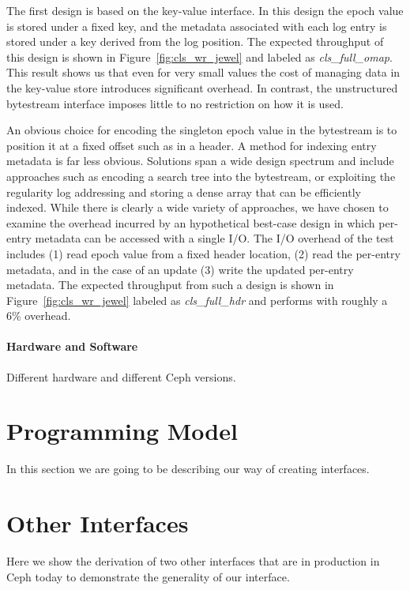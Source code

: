 \documentclass[10pt,twocolumn]{article}
\begin{document}
The first design is based on the key-value interface. In this design the epoch
value is stored under a fixed key, and the metadata associated with each log
entry is stored under a key derived from the log position. The expected throughput of
this design is shown in Figure~\ref{fig:cls_wr_jewel} and labeled as
\emph{cls\_full\_omap}. This result shows us that even for very small values
the cost of managing data in the key-value store introduces significant
overhead. In contrast, the unstructured bytestream interface imposes little
to no restriction on how it is used.

An obvious choice for encoding the singleton epoch value in the bytestream is
to position it at a fixed offset such as in a header. A method for indexing
entry metadata is far less obvious. Solutions span a wide design spectrum and
include approaches such as encoding a search tree into the bytestream, or
exploiting the regularity log addressing and storing a dense array that can be
efficiently indexed. While there is clearly a wide variety of approaches, we
have chosen to examine the overhead incurred by an hypothetical best-case
design in which per-entry metadata can be accessed with a single I/O. The I/O
overhead of the test includes (1) read epoch value from a fixed header
location, (2) read the per-entry metadata, and in the case of an update (3)
write the updated per-entry metadata. The expected throughput from such a
design is shown in Figure~\ref{fig:cls_wr_jewel} labeled as
\emph{cls\_full\_hdr} and performs with roughly a 6\% overhead.

\paragraph*{Hardware and Software}

Different hardware and different Ceph versions.

\section{Programming Model}

In this section we are going to be describing our way of creating interfaces.

\section{Other Interfaces}

Here we show the derivation of two other interfaces that are in production in
Ceph today to demonstrate the generality of our interface.
\end{document}
